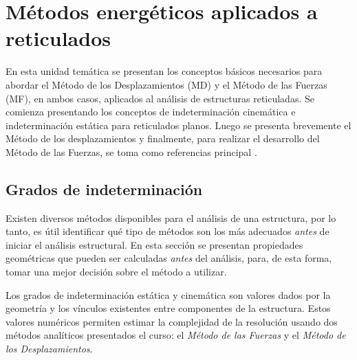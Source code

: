%
%
%

\chapter[Métodos energéticos aplicados a reticulados]{Métodos energéticos aplicados a reticulados}

En esta unidad temática se presentan los conceptos básicos necesarios para abordar el Método de los Desplazamientos (MD) y el Método de las Fuerzas (MF), en ambos casos, aplicados al análisis de estructuras reticuladas. %
%
Se comienza presentando los conceptos de indeterminación cinemática e indeterminación estática  para reticulados planos. %
%
Luego se presenta brevemente el Método de los desplazamientos y finalmente, para realizar el desarrollo del Método de las Fuerzas, se toma como referencias principal \citep{Reddy2002b}.


\section{Grados de indeterminación}

Existen diversos métodos disponibles para el análisis de una estructura, por lo tanto, es útil identificar qué tipo de métodos son los más adecuados \textit{antes} de iniciar el análisis estructural. %
%
En esta sección se presentan propiedades geométricas que pueden ser calculadas \textit{antes} del análisis, para, de esta forma, tomar una mejor decisión sobre el método a utilizar.

Los grados de indeterminación estática y cinemática son valores dados por la geometría y los vínculos existentes entre componentes de la estructura. %
%
Estos valores numéricos permiten estimar la complejidad de la resolución usando dos métodos analíticos presentados el curso: el \textit{Método de las Fuerzas} y el \textit{Método de los Desplazamientos}. %
%


